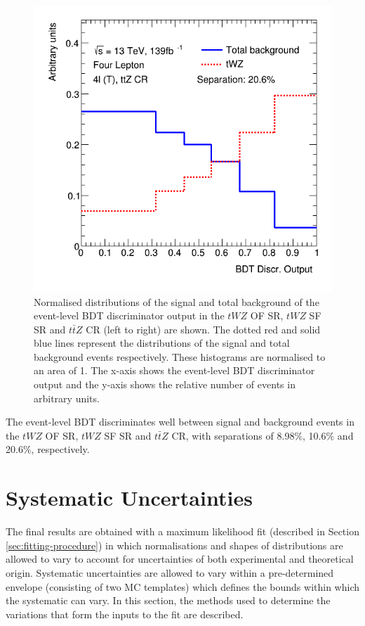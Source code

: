 \begin{figure}[h!]
	\includegraphics[scale=0.27]{figures/lep4_ttZ_4T.png}
	\centering
	\caption{Normalised distributions of the signal and total background of the event-level BDT discriminator output in the $tWZ$ OF SR, $tWZ$ SF SR and $t\bar{t}Z$ CR (left to right) are shown. The dotted red and solid blue lines represent the distributions of the signal and total background events respectively. These histograms are normalised to an area of 1. The x-axis shows the event-level BDT discriminator output and the y-axis shows the relative number of events in arbitrary units.}
	\label{fig:2vsm-normdists}
\end{figure}

The event-level BDT discriminates well between signal and background events in the $tWZ$ OF SR, $tWZ$ SF SR and $t\bar{t}Z$ CR, with separations of 8.98$\%$, 10.6$\%$ and 20.6$\%$, respectively.


\section{Systematic Uncertainties}
\label{sec:systematics}
The final results are obtained with a maximum likelihood fit (described in Section \ref{sec:fitting-procedure}) in which normalisations and shapes of distributions are allowed to vary to account for uncertainties of both experimental and theoretical origin. Systematic uncertainties are allowed to vary within a pre-determined envelope (consisting of two MC templates) which defines the bounds within which the systematic can vary. In this section, the methods used to determine the variations that form the inputs to the fit are described.


